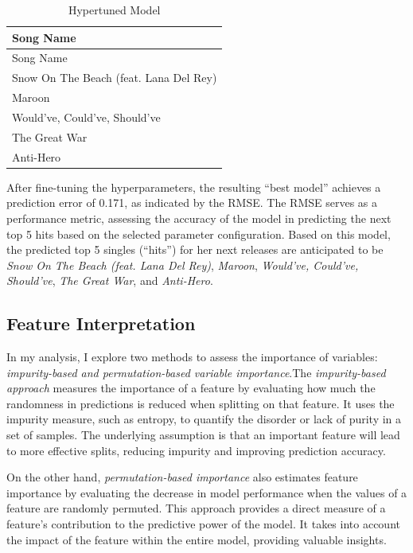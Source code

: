 \documentclass[11pt,preprint, authoryear]{elsarticle}
\numberwithin{equation}{section}
\numberwithin{figure}{section}
\numberwithin{table}{section}
\begin{document}
\begin{longtable}[]{@{}l@{}}
\caption{Hypertuned Model}\tabularnewline
\toprule()
Song Name \\
\midrule()
\endfirsthead
\toprule()
Song Name \\
\midrule()
\endhead
Snow On The Beach (feat. Lana Del Rey) \\
Maroon \\
Would've, Could've, Should've \\
The Great War \\
Anti-Hero \\
\bottomrule()
\end{longtable}

After fine-tuning the hyperparameters, the resulting ``best model''
achieves a prediction error of 0.171, as indicated by the RMSE. The RMSE
serves as a performance metric, assessing the accuracy of the model in
predicting the next top 5 hits based on the selected parameter
configuration. Based on this model, the predicted top 5 singles
(``hits'') for her next releases are anticipated to be \emph{Snow On The
Beach (feat. Lana Del Rey)}, \emph{Maroon}, \emph{Would've, Could've,
Should've}, \emph{The Great War}, and \emph{Anti-Hero}.

\hypertarget{feature-interpretation}{%
\subsection*{Feature Interpretation}\label{feature-interpretation}}

In my analysis, I explore two methods to assess the importance of
variables: \emph{impurity-based and permutation-based variable
importance}.The \emph{impurity-based approach} measures the importance
of a feature by evaluating how much the randomness in predictions is
reduced when splitting on that feature. It uses the impurity measure,
such as entropy, to quantify the disorder or lack of purity in a set of
samples. The underlying assumption is that an important feature will
lead to more effective splits, reducing impurity and improving
prediction accuracy.

On the other hand, \emph{permutation-based importance} also estimates
feature importance by evaluating the decrease in model performance when
the values of a feature are randomly permuted. This approach provides a
direct measure of a feature's contribution to the predictive power of
the model. It takes into account the impact of the feature within the
entire model, providing valuable insights.
\end{document}
